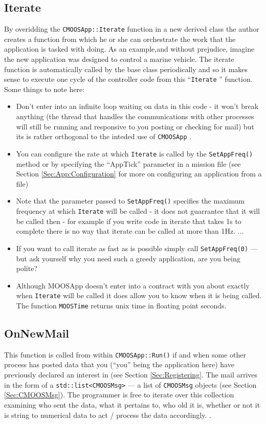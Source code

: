 \documentclass[a4paper,10pt]{article}
\newcommand{\Code}[1]{\texttt{#1} }
\newcommand{\code}[1]{\Code{#1} }
\begin{document}
\subsection{Iterate}\label{Sec:Iterate}
By overidding the \code{CMOOSApp::Iterate} function in a new
derived class the author creates a function from which he or she
can orchestrate the work that the application is tasked with
doing. As an example,and without prejudice, imagine the new
application was designed to control a marine vehicle. The iterate
function is automatically called by the base class periodically
and so it makes sense to execute one cycle of the controller code
from this ``\code{Iterate}'' function. Some things to note here:
\begin{itemize}
\item Don't enter into an infinite loop waiting on data in this code - it won't break anything (the thread that handles the communications with other processes will still be running and responsive to you posting or checking for mail) but its is rather orthogonal to the inteded use of \code{CMOOSApp}.
\item You can configure the rate at which \code{Iterate} is called by the \code{SetAppFreq()} method or by specifying the ``AppTick'' parameter in a mission file (see Section \ref{Sec:App:Configuration} for more on configuring an application from a file)
\item Note that the parameter passed to \code{SetAppFreq()} specifies the maximum frequency at which \code{Iterate} will be called - it does not guarrantee that it will be called then - for example if you write code in iterate that takes 1s to complete there is no way that iterate can be called at more than 1Hz. ...
\item If you want to call iterate as fast as is possible simply call  \code{SetAppFreq(0)} --- but ask yourself why you need such a greedy application, are you being polite?
\item Although MOOSApp doesn't enter into a contract with you about exactly when \code{Iterate} will be called it does allow you to know when it is being called. The function \code{MOOSTime} returns unix time in floating point seconds.
\end{itemize}


\subsection{OnNewMail}\label{Sec:OnNewMail}

This function is called from within \code{CMOOSApp::Run()} if and
when some other process has posted data that you (``you'' being
the application here) have previously declared an interest in (see
Section \ref{Sec:Registering}. The mail arrives in the form
of a \code{std::list<CMOOSMsg>} --- a list of \code{CMOOSMsg}
objects (see Section \ref{Sec:CMOOSMsg}). The programmer is free to
iterate over this collection examining who sent the data, what it
pertains to, who old it is, whether or not it is string to
numerical data to act / process the data accordingly. .
\end{document}
